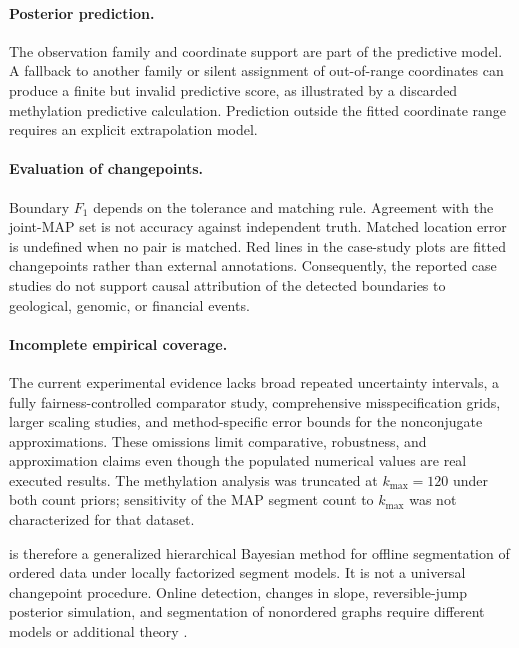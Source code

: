 \paragraph{Posterior prediction.}
The observation family and coordinate support are part of the predictive model. A fallback to another family or silent assignment of out-of-range coordinates can produce a finite but invalid predictive score, as illustrated by a discarded methylation predictive calculation. Prediction outside the fitted coordinate range requires an explicit extrapolation model.

\paragraph{Evaluation of changepoints.}
Boundary $F_1$ depends on the tolerance and matching rule. Agreement with the \BayesBreak joint-MAP set is not accuracy against independent truth. Matched location error is undefined when no pair is matched. Red lines in the case-study plots are fitted changepoints rather than external annotations. Consequently, the reported case studies do not support causal attribution of the detected boundaries to geological, genomic, or financial events.

\paragraph{Incomplete empirical coverage.}
The current experimental evidence lacks broad repeated uncertainty intervals, a fully fairness-controlled comparator study, comprehensive misspecification grids, larger scaling studies, and method-specific error bounds for the nonconjugate approximations. These omissions limit comparative, robustness, and approximation claims even though the populated numerical values are real executed results. The methylation analysis was truncated at $k_{\max}=120$ under both count priors; sensitivity of the MAP segment count to $k_{\max}$ was not characterized for that dataset.



\BayesBreak is therefore a generalized hierarchical Bayesian method for offline segmentation of ordered data under locally factorized segment models. It is not a universal changepoint procedure. Online detection, changes in slope, reversible-jump posterior simulation, and segmentation of nonordered graphs require different models or additional theory \citep{adamsmackay2007bocpd,ruggieri2014bcpvs,green1995rjMCMC,fearnhead2006exact}.
